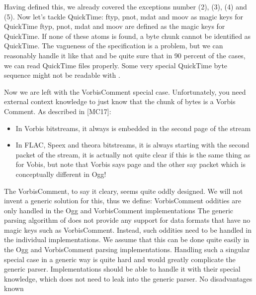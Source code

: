 Having defined this, we already covered the exceptions number (2), (3), (4) and (5). Now let's tackle QuickTime:
{%
ftyp, pnot, mdat and moov as magic keys for QuickTime
}
{%
ftyp, pnot, mdat and moov are defined as the magic keys for QuickTime. If none of these atoms is found, a byte chunk cannot be identified as QuickTime.
}
{%
The vagueness of the specification is a problem, but we can reasonably handle it like that and be quite sure that in 90 percent of the cases, we can read QuickTime files properly.
}
{%
Some very special QuickTime byte sequence might not be readable with \LibName{}.
}

Now we are left with the VorbisComment special case. Unfortunately, you need external context knowledge to just know that the chunk of bytes is a Vorbis Comment. As described in \cite{MC17}[MC17]:
\begin{itemize}
\item In Vorbis bitstreams, it always is embedded in the second page of the stream
\item In FLAC, Speex and theora bitstreams, it is always starting with the second packet of the stream, it is actually not quite clear if this is the same thing as for Vobis, but note that Vorbis says page and the other say packet which is conceptually different in Ogg!
\end{itemize}

The VorbisComment, to say it cleary, seems quite oddly designed. We will not invent a generic solution for this, thus we define:
{%
VorbisComment oddities are only handled in the Ogg and VorbisComment implementations
}
{%
The generic parsing algorithm of \LibName{} does not provide any support for data formats that have no magic keys such as VorbisComment. Instead, such oddities need to be handled in the individual implementations. We assume that this can be done quite easily in the Ogg and VorbisComment parsing implementations.
}
{%
Handling such a singular special case in a generic way is quite hard and would greatly complicate the generic parser. Implementations should be able to handle it with their special knowledge, which does not need to leak into the generic parser.
}
{%
No disadvantages known
}

